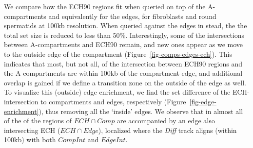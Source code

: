 \documentclass[
  11pt,
  a4paper,
]{scrbook}
\let\oldemph\emph
\renewcommand\emph[1]{\oldemph{\color{gray}#1}}
\begin{document}
We compare how the ECH90 regions fit when queried on top of the
A-compartments and equivalently for the edges, for fibroblasts and round
spermatids at 100kb resolution. When queried against the edges in stead,
the the total set size is reduced to less than 50\%. Interestingly, some
of the intersections between A-compartments and ECH90 remain, and new
ones appear as we move to the outside edge of the compartment
(Figure~\ref{fig-comps-edges-ech}). This indicates that most, but not
all, of the intersection between ECH90 regions and the A-compartments
are within 100kb of the compartment edge, and additional overlap is
gained if we define a transition zone on the outside of the edge as
well. To visualize this (outside) edge enrichment, we find the set
difference of the ECH-intersection to compartments and edges,
respectively (Figure~\ref{fig-edge-enrichment}), thus removing all the
`inside' edges. We observe that in almost all of the of the regions of
\(ECH \cap Comp\) are accompanied by an edge also intersecting ECH
(\(ECH \cap Edge\)), localized where the \emph{Diff} track aligns
(within 100kb) with both \(CompInt\) and \(EdgeInt\).
\end{document}
